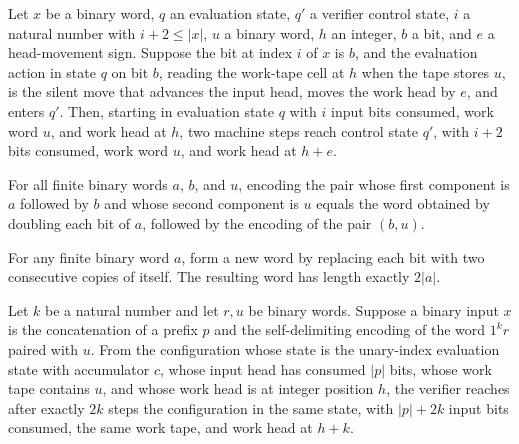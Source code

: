 \begin{lemma}
\label{Complexity.taut_eval_double}
\leanok
{}
Let $x$ be a binary word, $q$ an evaluation state, $q'$ a verifier control state, $i$ a
natural number with $i+2\le |x|$, $u$ a binary word, $h$ an integer, $b$ a bit, and $e$
a head-movement sign. Suppose the bit at index $i$ of $x$ is $b$, and the evaluation
action in state $q$ on bit $b$, reading the work-tape cell at $h$ when the tape stores
$u$, is the silent move that advances the input head, moves the work head by $e$, and
enters $q'$. Then, starting in evaluation state $q$ with $i$ input bits consumed, work
word $u$, and work head at $h$, two machine steps reach control state $q'$, with $i+2$
bits consumed, work word $u$, and work head at $h+e$.
\end{lemma}

\begin{lemma}
\label{Complexity.taut_pair_append}
\leanok
{}
For all finite binary words $a$, $b$, and $u$, encoding the pair whose first component
is $a$ followed by $b$ and whose second component is $u$ equals the word obtained by
doubling each bit of $a$, followed by the encoding of the pair $(b,u)$.
\end{lemma}

\begin{lemma}
\label{Complexity.taut_double_length}
\leanok
{}
For any finite binary word $a$, form a new word by replacing each bit with two
consecutive copies of itself. The resulting word has length exactly $2|a|$.
\end{lemma}

\begin{lemma}
\label{Complexity.taut_unary_run}
\leanok
{}
Let $k$ be a natural number and let $r,u$ be binary words. Suppose a binary input $x$ is
the concatenation of a prefix $p$ and the self-delimiting encoding of the word $1^k r$
paired with $u$. From the configuration whose state is the unary-index evaluation state
with accumulator $c$, whose input head has consumed $|p|$ bits, whose work tape contains
$u$, and whose work head is at integer position $h$, the verifier reaches after exactly
$2k$ steps the configuration in the same state, with $|p|+2k$ input bits consumed, the
same work tape, and work head at $h+k$.
\end{lemma}

